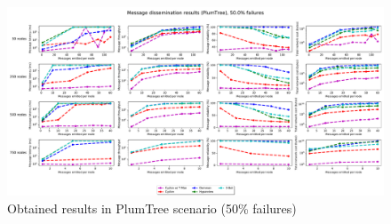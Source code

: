 \begin{landscape}
\begin{figure}[htbp]
    \centering
    \includegraphics[width=\columnwidth]{Chapters/evaluation/figures/flood/plumTree_50.0_failures.pdf}
    \caption{Obtained results in PlumTree scenario (50\% failures)}
    \label{fig:pouchbeasts-overview}
\end{figure}



\end{landscape}
